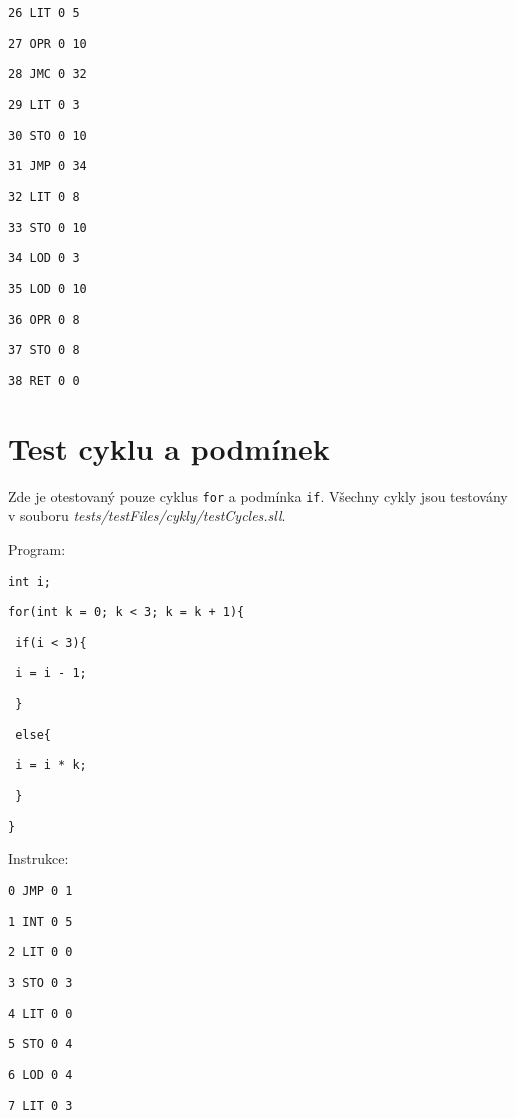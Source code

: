 \documentclass[czech]{thesiskiv}
\begin{document}
\texttt{26	LIT	0	5 }

\texttt{27	OPR	0	10 }

\texttt{28	JMC	0	32  }

\texttt{29	LIT	0	3    }

\texttt{30	STO	0	10    }

\texttt{31	JMP	0	34     }

\texttt{32	LIT	0	8       }

\texttt{33	STO	0	10       }

\texttt{34	LOD	0	3         }

\texttt{35	LOD	0	10         }

\texttt{36	OPR	0	8           }

\texttt{37	STO	0	8            }

\texttt{38	RET	0	0             }



\section{Test cyklu a podmínek}

Zde je otestovaný pouze cyklus \texttt{for} a podmínka \texttt{if}.
Všechny cykly jsou testovány v souboru \textit{tests/testFiles/cykly/testCycles.sll}.

\noindent Program:

\texttt{int i;}

\texttt{for(int k = 0; k < 3; k = k + 1)\{}
    
\texttt{    if(i < 3)\{ }

\texttt{        i = i - 1;}

\texttt{    \}             }

\texttt{    else\{          }

\texttt{        i = i * k;  }

\texttt{    \}            }

\texttt{\}                 }

\noindent Instrukce:

\texttt{0	JMP	0	1}

\texttt{1	INT	0	5}

\texttt{2	LIT	0	0 }

\texttt{3	STO	0	3  }

\texttt{4	LIT	0	0   }

\texttt{5	STO	0	4    }

\texttt{6	LOD	0	4     }

\texttt{7	LIT	0	3      }
\end{document}
